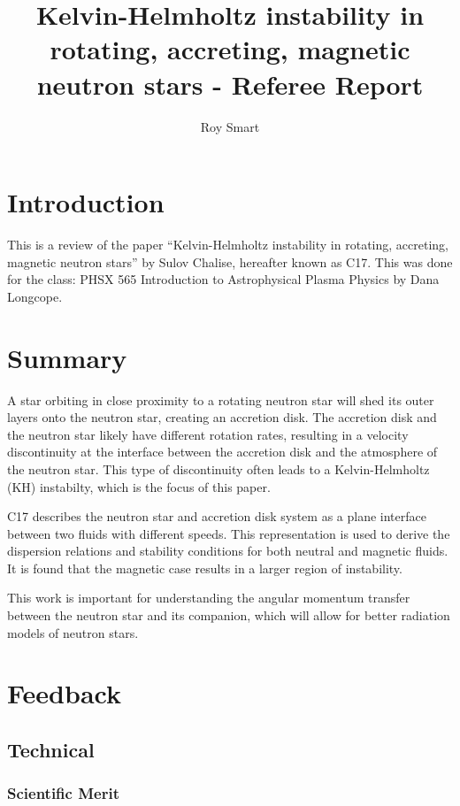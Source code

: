 \documentclass[10pt,letterpaper]{article}
\title{Kelvin-Helmholtz instability in rotating, accreting, magnetic neutron stars - Referee Report}
\author{Roy Smart}
\begin{document}
	
	\maketitle
	
	\section{Introduction}

		This is a review of the paper ``Kelvin-Helmholtz instability in rotating, accreting, magnetic neutron stars'' by Sulov Chalise, hereafter known as C17.
		This was done for the class: PHSX 565 Introduction to Astrophysical Plasma Physics by Dana Longcope.
	
	\section{Summary}
	
		A star orbiting in close proximity to a rotating neutron star will shed its outer layers onto the neutron star, creating an accretion disk. 
		The accretion disk and the neutron star likely have different rotation rates, resulting in a velocity discontinuity at the interface between the accretion disk and the atmosphere of the neutron star.
		This type of discontinuity often leads to a Kelvin-Helmholtz (KH) instabilty, which is the focus of this paper.
		
		C17 describes the neutron star and accretion disk system as a plane interface between two fluids with different speeds.
		This representation is used to derive the dispersion relations and stability conditions for both neutral and magnetic fluids.
		It is found that the magnetic case results in a larger region of instability.
		
		This work is important for understanding the angular momentum transfer between the neutron star and its companion, which will allow for better radiation models of neutron stars.
	
	\section{Feedback}
		\subsection{Technical}
			\subsubsection{Scientific Merit}
			
\end{document}

